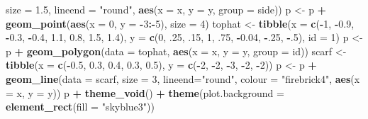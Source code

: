 \documentclass[
]{book}
\newenvironment{Shaded}{\begin{snugshade}}{\end{snugshade}}
\newcommand{\AttributeTok}[1]{\textcolor[rgb]{0.13,0.29,0.53}{#1}}
\newcommand{\DecValTok}[1]{\textcolor[rgb]{0.00,0.00,0.81}{#1}}
\newcommand{\FloatTok}[1]{\textcolor[rgb]{0.00,0.00,0.81}{#1}}
\newcommand{\FunctionTok}[1]{\textcolor[rgb]{0.13,0.29,0.53}{\textbf{#1}}}
\newcommand{\NormalTok}[1]{#1}
\newcommand{\OtherTok}[1]{\textcolor[rgb]{0.56,0.35,0.01}{#1}}
\newcommand{\SpecialCharTok}[1]{\textcolor[rgb]{0.81,0.36,0.00}{\textbf{#1}}}
\newcommand{\StringTok}[1]{\textcolor[rgb]{0.31,0.60,0.02}{#1}}
\begin{document}
\begin{Shaded}
\begin{Highlighting}[]
            \AttributeTok{size =} \FloatTok{1.5}\NormalTok{, }\AttributeTok{lineend =} \StringTok{"round"}\NormalTok{,}
            \FunctionTok{aes}\NormalTok{(}\AttributeTok{x =}\NormalTok{ x, }\AttributeTok{y =}\NormalTok{ y, }\AttributeTok{group =}\NormalTok{ side))}
\NormalTok{p }\OtherTok{\textless{}{-}}\NormalTok{ p }\SpecialCharTok{+} \FunctionTok{geom\_point}\NormalTok{(}\FunctionTok{aes}\NormalTok{(}\AttributeTok{x =} \DecValTok{0}\NormalTok{, }\AttributeTok{y =} \SpecialCharTok{{-}}\DecValTok{3}\SpecialCharTok{:{-}}\DecValTok{5}\NormalTok{), }\AttributeTok{size =} \DecValTok{4}\NormalTok{)}
\NormalTok{tophat }\OtherTok{\textless{}{-}} \FunctionTok{tibble}\NormalTok{(}\AttributeTok{x =} \FunctionTok{c}\NormalTok{(}\SpecialCharTok{{-}}\DecValTok{1}\NormalTok{, }\SpecialCharTok{{-}}\FloatTok{0.9}\NormalTok{, }\SpecialCharTok{{-}}\FloatTok{0.3}\NormalTok{, }\SpecialCharTok{{-}}\FloatTok{0.4}\NormalTok{, }\FloatTok{1.1}\NormalTok{, }\FloatTok{0.8}\NormalTok{, }\FloatTok{1.5}\NormalTok{, }\FloatTok{1.4}\NormalTok{),}
                 \AttributeTok{y =} \FunctionTok{c}\NormalTok{(}\DecValTok{0}\NormalTok{, .}\DecValTok{25}\NormalTok{, .}\DecValTok{15}\NormalTok{, }\DecValTok{1}\NormalTok{, .}\DecValTok{75}\NormalTok{, }\SpecialCharTok{{-}}\FloatTok{0.04}\NormalTok{, }\SpecialCharTok{{-}}\NormalTok{.}\DecValTok{25}\NormalTok{, }\SpecialCharTok{{-}}\NormalTok{.}\DecValTok{5}\NormalTok{),}
                 \AttributeTok{id =} \DecValTok{1}\NormalTok{)}
\NormalTok{p }\OtherTok{\textless{}{-}}\NormalTok{ p }\SpecialCharTok{+} \FunctionTok{geom\_polygon}\NormalTok{(}\AttributeTok{data =}\NormalTok{ tophat, }
               \FunctionTok{aes}\NormalTok{(}\AttributeTok{x =}\NormalTok{ x, }\AttributeTok{y =}\NormalTok{ y, }\AttributeTok{group =}\NormalTok{ id))}
\NormalTok{scarf }\OtherTok{\textless{}{-}} \FunctionTok{tibble}\NormalTok{(}\AttributeTok{x =} \FunctionTok{c}\NormalTok{(}\SpecialCharTok{{-}}\FloatTok{0.5}\NormalTok{, }\FloatTok{0.3}\NormalTok{, }\FloatTok{0.4}\NormalTok{, }\FloatTok{0.3}\NormalTok{, }\FloatTok{0.5}\NormalTok{),}
                \AttributeTok{y =} \FunctionTok{c}\NormalTok{(}\SpecialCharTok{{-}}\DecValTok{2}\NormalTok{, }\SpecialCharTok{{-}}\DecValTok{2}\NormalTok{, }\SpecialCharTok{{-}}\DecValTok{3}\NormalTok{, }\SpecialCharTok{{-}}\DecValTok{2}\NormalTok{, }\SpecialCharTok{{-}}\DecValTok{2}\NormalTok{))}
\NormalTok{p }\OtherTok{\textless{}{-}}\NormalTok{ p }\SpecialCharTok{+} \FunctionTok{geom\_line}\NormalTok{(}\AttributeTok{data =}\NormalTok{ scarf, }\AttributeTok{size =} \DecValTok{3}\NormalTok{, }
            \AttributeTok{lineend=}\StringTok{"round"}\NormalTok{,}
            \AttributeTok{colour =} \StringTok{"firebrick4"}\NormalTok{,}
            \FunctionTok{aes}\NormalTok{(}\AttributeTok{x =}\NormalTok{ x, }\AttributeTok{y =}\NormalTok{ y))}
\NormalTok{p }\SpecialCharTok{+} \FunctionTok{theme\_void}\NormalTok{() }\SpecialCharTok{+}
    \FunctionTok{theme}\NormalTok{(}\AttributeTok{plot.background =} \FunctionTok{element\_rect}\NormalTok{(}\AttributeTok{fill =} \StringTok{"skyblue3"}\NormalTok{))}
\end{Highlighting}
\end{Shaded}
\end{document}

